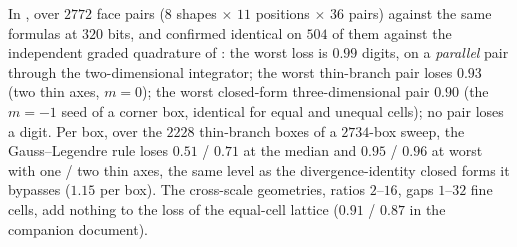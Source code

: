 In , over $2772$ face pairs ($8$ shapes $\times$ $11$ positions $\times$
$36$ pairs) against the same formulas at $320$ bits, and confirmed identical on $504$ of
them against the independent graded quadrature of : the worst
loss is $0.99$ digits, on a \emph{parallel} pair through the two-dimensional integrator; the
worst thin-branch pair loses $0.93$ (two thin axes, $m = 0$); the worst closed-form
three-dimensional pair $0.90$ (the $m = -1$ seed of a corner box, identical for equal and
unequal cells); no pair loses a digit. Per box, over the $2228$ thin-branch boxes of a
$2734$-box sweep, the Gauss--Legendre rule loses $0.51$ / $0.71$ at the median and $0.95$ /
$0.96$ at worst with one / two thin axes, the same level as the divergence-identity closed
forms it bypasses ($1.15$ per box). The cross-scale geometries, ratios $2$--$16$, gaps
$1$--$32$ fine cells, add nothing to the loss of the equal-cell lattice ($0.91$ / $0.87$ in
the companion document).

